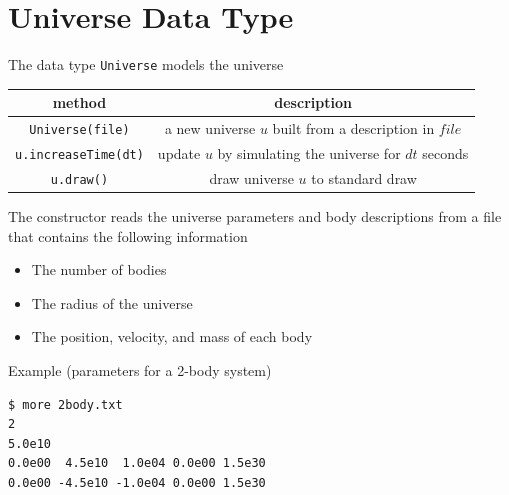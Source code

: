 \documentclass[8pt,a4paper,compress]{beamer}
\begin{document}
\section{Universe Data Type}
\begin{frame}[fragile]
\pause

The data type \lstinline{Universe} models the universe
\begin{center}
\begin{tabular}{cc}
method & description \\ \hline
\lstinline$Universe(file)$ & a new universe $u$ built from a description in $file$ \\
\lstinline$u.increaseTime(dt)$ & update $u$ by simulating the universe for $dt$ seconds \\
\lstinline$u.draw()$ & draw universe $u$ to standard draw
\end{tabular} 
\end{center}

\pause
\bigskip

The constructor reads the universe parameters and body descriptions from a file that contains the following information
\begin{itemize}
\item The number of bodies
\item The radius of the universe
\item The position, velocity, and mass of each body
\end{itemize}

\pause
\bigskip

Example (parameters for a 2-body system)
\begin{lstlisting}[language={},style=focusin]
$ more 2body.txt
2 
5.0e10 
0.0e00  4.5e10  1.0e04 0.0e00 1.5e30 
0.0e00 -4.5e10 -1.0e04 0.0e00 1.5e30 
\end{lstlisting}
\end{frame}
\end{document}
